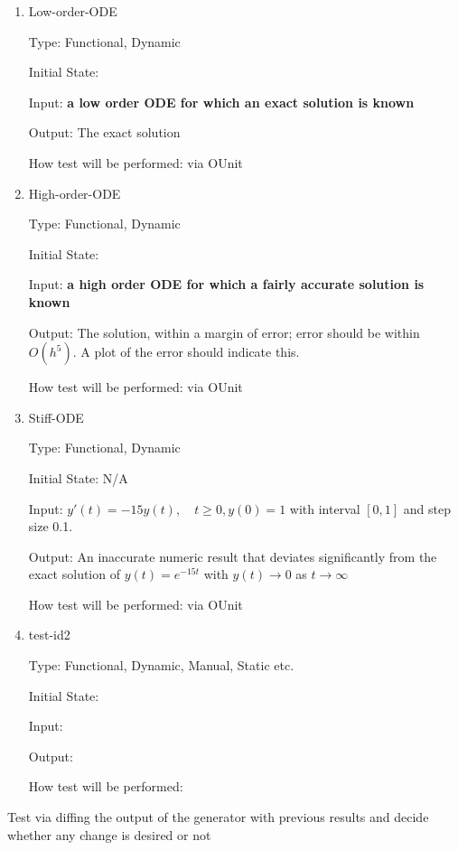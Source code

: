 \documentclass[12pt, titlepage]{article}
\begin{document}
\begin{enumerate}

\item{Low-order-ODE\\}

Type: Functional, Dynamic
					
Initial State: 
					
Input: \textbf{a low order ODE for which an exact solution is known}
					
Output: The exact solution
					
How test will be performed: via OUnit
					
\item{High-order-ODE\\}

Type: Functional, Dynamic

Initial State: 

Input: \textbf{a high order ODE for which a fairly accurate solution is known}

Output: The solution, within a margin of error; error should be within 
$O(h^5)$. A plot of the error should indicate this.

How test will be performed: via OUnit

\item{Stiff-ODE\\}

Type: Functional, Dynamic

Initial State: N/A

Input: $y'(t) = -15y(t),\quad t \geq 0, y(0) = 1$ with interval $[0,1]$ and 
step size 0.1.

Output: An inaccurate numeric result that deviates significantly from the exact 
solution of $y(t) = e^{-15t}$ with $y(t) \rightarrow 0$ as $t \rightarrow 
\infty$

How test will be performed: via OUnit


\item{test-id2\\}

Type: Functional, Dynamic, Manual, Static etc.
					
Initial State: 
					
Input: 
					
Output: 
					
How test will be performed: 

\end{enumerate}

Test via diffing the output of the generator with previous results and decide 
whether any change is desired or not
\end{document}
